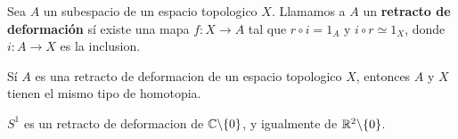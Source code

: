 \begin{definition}
    Sea $A$ un subespacio de un espacio topologico  $X$. Llamamos a $A$ un
    \textbf{retracto de deformaci\'on} s\'i existe una mapa $f:X \xrightarrow{}
    A$ tal que $r \circ i=1_A$ y  $i \circ r \simeq 1_X$, donde  $i:A
    \xrightarrow{} X$ es la inclusion.
\end{definition}

\begin{theorem}\label{9.22}
    S\'i $A$ es una retracto de deformacion de un espacio topologico  $X$,
    entonces  $A$ y  $X$ tienen el mismo tipo de homotopia.
\end{theorem}

\begin{example}\label{}
    $S^1$ es un retracto de deformacion de  $\mathbb{C}\backslash\{0\}$, y igualmente de
    $\mathbb{R}^2\backslash\{0\}$.
\end{example}
